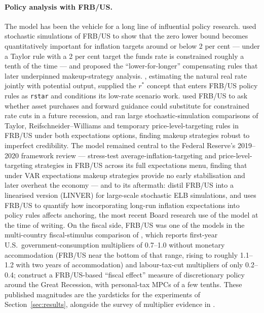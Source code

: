 \paragraph{Policy analysis with FRB/US.} The model has been the vehicle for a long line of influential policy research. \citet{reifschneider2000three} used stochastic simulations of FRB/US to show that the zero lower bound becomes quantitatively important for inflation targets around or below 2 per cent --- under a Taylor rule with a 2 per cent target the funds rate is constrained roughly a tenth of the time --- and proposed the ``lower-for-longer'' compensating rules that later underpinned makeup-strategy analysis. \citet{laubach2003measuring}, estimating the natural real rate jointly with potential output, supplied the $r^{*}$ concept that enters FRB/US policy rules as \texttt{rstar} and conditions its low-rate scenario work. \citet{reifschneider2016gauging} used FRB/US to ask whether asset purchases and forward guidance could substitute for constrained rate cuts in a future recession, and \citet{bernanke2019strategies} ran large stochastic-simulation comparisons of Taylor, Reifschneider--Williams and temporary price-level-targeting rules in FRB/US under both expectations options, finding makeup strategies robust to imperfect credibility. The model remained central to the Federal Reserve's 2019--2020 framework review --- \citet{hebden2020makeup} stress-test average-inflation-targeting and price-level-targeting strategies in FRB/US across its full expectations menu, finding that under VAR expectations makeup strategies provide no early stabilisation and later overheat the economy --- and to its aftermath: \citet{brayton2022linver} distil FRB/US into a linearised version (LINVER) for large-scale stochastic ELB simulations, and \citet{kiley2025anchoring} uses FRB/US to quantify how incorporating long-run inflation expectations into policy rules affects anchoring, the most recent Board research use of the model at the time of writing. On the fiscal side, FRB/US was one of the models in the multi-country fiscal-stimulus comparison of \citet{coenen2012effects}, which reports first-year U.S.\ government-consumption multipliers of 0.7--1.0 without monetary accommodation (FRB/US near the bottom of that range, rising to roughly 1.1--1.2 with two years of accommodation) and labour-tax-cut multipliers of only 0.2--0.4; \citet{cashin2018fiscal} construct a FRB/US-based ``fiscal effect'' measure of discretionary policy around the Great Recession, with personal-tax MPCs of a few tenths. These published magnitudes are the yardsticks for the experiments of Section~\ref{sec:results}, alongside the survey of multiplier evidence in \citet{whalen2015fiscal}.

